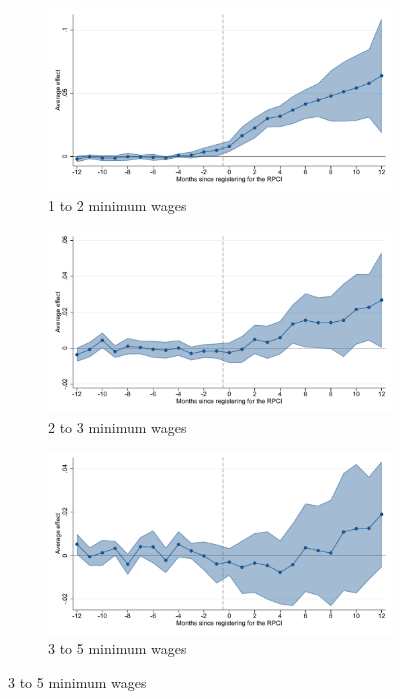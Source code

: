 \begin{figure}[H]
    \begin{subfigure}{0.32\textwidth}
    \caption{1 to 2 minimum wages}
    \includegraphics[width=\textwidth]{04_Figures/muestra_10porciento/event_study_log_sal_cierre_sal_min_1_2_dcdh_connected.pdf}
    \end{subfigure}
    \begin{subfigure}{0.32\textwidth}
    \caption{2 to 3 minimum wages}
    \includegraphics[width=\textwidth]{04_Figures/muestra_10porciento/event_study_log_sal_cierre_sal_min_2_3_dcdh_connected.pdf}
    \end{subfigure}
    \begin{subfigure}{0.32\textwidth}
    \caption{3 to 5 minimum wages}
    \includegraphics[width=\textwidth]{04_Figures/muestra_10porciento/event_study_log_sal_cierre_sal_min_3_5_dcdh_connected.pdf}
    \end{subfigure}


\end{figure}

